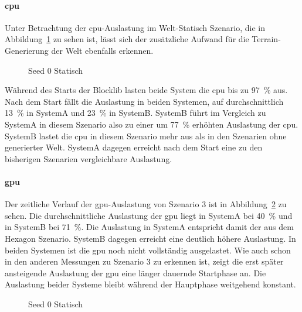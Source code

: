 \paragraph{\ac{cpu}}
Unter Betrachtung der \ac{cpu}-Auslastung im Welt-Statisch Szenario, die in Abbildung~\ref{fig:seed-0-static-cpu} zu sehen ist, lässt sich der zusätzliche Aufwand für die Terrain-Generierung der Welt ebenfalls erkennen.
\begin{figure}[!htbp]
	\caption{Seed 0 Statisch}\label{fig:seed-0-static-cpu}
\end{figure}
Während des Starts der Blocklib lasten beide System die \ac{cpu} bis zu \SI{97}{\percent} aus. Nach dem Start fällt die Auslastung in beiden Systemen, auf durchschnittlich \SI{13}{\percent} in SystemA und \SI{23}{\percent} in SystemB.
SystemB führt im Vergleich zu SystemA in diesem Szenario also zu einer um \SI{77}{\percent} erhöhten Auslastung der \ac{cpu}. SystemB lastet die \ac{cpu} in diesem Szenario mehr aus als in den Szenarien ohne generierter Welt. SystemA dagegen erreicht nach dem Start eine zu den bisherigen Szenarien vergleichbare Auslastung.

\paragraph{\ac{gpu}}
Der zeitliche Verlauf der \ac{gpu}-Auslastung von Szenario 3 ist in Abbildung~\ref{fig:seed-0-static-gpu} zu sehen. Die durchschnittliche Auslastung der \ac{gpu} liegt in SystemA bei \SI{40}{\percent} und in SystemB bei \SI{71}{\percent}. Die Auslastung in SystemA entspricht damit der aus dem Hexagon Szenario. SystemB dagegen erreicht eine deutlich höhere Auslastung. In beiden Systemen ist die \ac{gpu} noch nicht vollständig ausgelastet. Wie auch schon in den anderen Messungen zu Szenario 3 zu erkennen ist, zeigt die erst später ansteigende Auslastung der \ac{gpu} eine länger dauernde Startphase an. Die Auslastung beider Systeme bleibt während der Hauptphase weitgehend konstant.
\begin{figure}[!htbp]
	\caption{Seed 0 Statisch}\label{fig:seed-0-static-gpu}
\end{figure}

